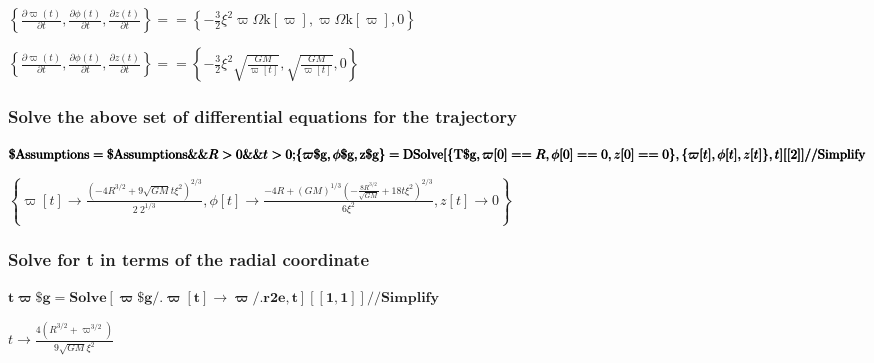 \documentclass{article}
\begin{document}
\begin{doublespace}
\noindent\(\left\{\frac{\partial \varpi (t)}{\partial t},\frac{\partial \phi (t)}{\partial t},\frac{\partial z(t)}{\partial t}\right\}==\left\{-\frac{3}{2}
\xi ^2 \varpi  \text{$\Omega $k}[\varpi ],\varpi  \text{$\Omega $k}[\varpi ],0\right\}\)
\end{doublespace}

\begin{doublespace}
\noindent\(\left\{\frac{\partial \varpi (t)}{\partial t},\frac{\partial \phi (t)}{\partial t},\frac{\partial z(t)}{\partial t}\right\}==\left\{-\frac{3}{2}
\xi ^2 \sqrt{\frac{G M}{\varpi [t]}},\sqrt{\frac{G M}{\varpi [t]}},0\right\}\)
\end{doublespace}

\subsubsection*{Solve the above set of differential equations for the trajectory}

\begin{doublespace}
\noindent\(\pmb{\text{$\$$Assumptions} = \text{$\$$Assumptions} \&\& R >0 \&\& t>0;}\\
\pmb{\{\text{$\varpi \$$g},\text{$\phi \$$g},\text{z$\$$g}\}=\text{DSolve}[\{\text{T$\$$g}, \varpi [0] == R, \phi [0] == 0, z[0] ==0\},\{\varpi [t],
\phi [t],z[t]\},t][[2]] \text{//}\text{Simplify}}\)
\end{doublespace}

\begin{doublespace}
\noindent\(\left\{\varpi [t]\to \frac{\left(-4 R^{3/2}+9 \sqrt{G M} t \xi ^2\right)^{2/3}}{2\ 2^{1/3}},\phi [t]\to \frac{-4 R+(G M)^{1/3} \left(-\frac{8
R^{3/2}}{\sqrt{G M}}+18 t \xi ^2\right)^{2/3}}{6 \xi ^2},z[t]\to 0\right\}\)
\end{doublespace}

\subsubsection*{Solve for t in terms of the radial coordinate}

\begin{doublespace}
\noindent\(\pmb{\text{t$\varpi \$$g} = \text{Solve}[\text{$\varpi \$$g} \text{/.} \varpi [t]\to  \varpi \text{/.} \text{r2e}, t][[1,1]] \text{//}\text{Simplify}}\)
\end{doublespace}

\begin{doublespace}
\noindent\(t\to \frac{4 \left(R^{3/2}+\varpi ^{3/2}\right)}{9 \sqrt{G M} \xi ^2}\)
\end{doublespace}
\end{document}
